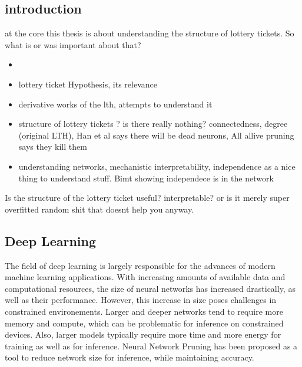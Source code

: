 \subsection{introduction}
at the core this thesis is about understanding the structure of lottery tickets. So what is or was important about that?
\begin{itemize}
    \item 
    \item lottery ticket Hypothesis, its relevance 
    \item derivative works of the lth, attempts to understand it
    \item structure of lottery tickets ? is there really nothing? connectedness, degree (original LTH), Han et al says there will be dead neurons, All allive pruning says they kill them
    \item understanding networks, mechanistic interpretability, independence as a nice thing to understand stuff. Bimt showing independece is in the network
\end{itemize}

Is the structure of the lottery ticket useful? interpretable? or is it merely super overfitted random shit that doesnt help you anyway.

\subsection{Deep Learning}
The field of deep learning is largely responsible for the advances of modern machine learning applications.
With increasing amounts of available data and computational resources, the size of neural networks has increased drastically, as well as their performance.
However, this increase in size poses challenges in constrained environements.
Larger and deeper networks tend to require more memory and compute, which can be problematic for inference on constrained devices.
Also, larger models typically require more time and more energy for training as well as for inference.
Neural Network Pruning \autocite{LeCun, OptimalBrainSurgeon, HanEtAl15, PruningFiltersForEfficientConvets} has been proposed as a tool to reduce network size for inference, while maintaining accuracy.

